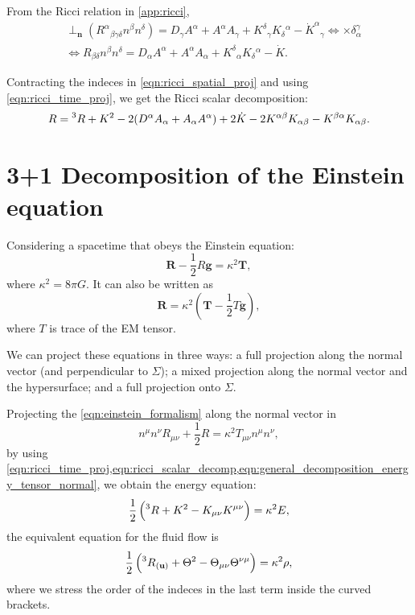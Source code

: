 From the Ricci relation in \cref{app:ricci},
\begin{align}
    &\perp_{\mathbf{n}} (R^\alpha{}_{\beta\gamma\delta} n^\beta n^\delta) = D_\gamma A^\alpha + A^\alpha A_\gamma + K^\delta{}_\gamma K_\delta{}^\alpha - \dot{K}^\alpha{}_\gamma \Leftrightarrow \times \delta^\gamma_\alpha\\
    &\Leftrightarrow  R_{\beta\delta}n^\beta n^\delta = D_\alpha A^\alpha + A^\alpha A_\alpha + K^\delta{}_\alpha K_\delta{}^\alpha -\dot{K}.
    \label{eqn:ricci_time_proj}
\end{align}


Contracting the indeces in \cref{eqn:ricci_spatial_proj} and using \cref{eqn:ricci_time_proj}, we get the Ricci scalar decomposition:
\begin{align}
    R = \prescript{3}{}R+K^2 - 2(D^\alpha A_\alpha +  A_\alpha A^\alpha) + 2\dot{K}-2K^{\alpha\beta}K_{\alpha\beta}-K^{\beta\alpha}K_{\alpha\beta}.
    \label{eqn:ricci_scalar_decomp}
\end{align}



\section{3+1 Decomposition of the Einstein equation}

Considering a spacetime that obeys the Einstein equation:
\begin{equation}
    \mathbf{R}-\frac{1}{2}R\mathbf{g}=\kappa^2 \mathbf{T},
    \label{eqn:einstein_formalism}
\end{equation}
where $\kappa^2=8\pi G$. It can also be written as
\begin{equation}
    \mathbf{R}=\kappa^2 \left(\mathbf{T}-\frac{1}{2}T\mathbf{g}\right),
    \label{eqn:einstein_equiv}
\end{equation}
where $T$ is trace of the EM tensor.

We can project these equations in three ways: a full projection along the normal vector (and perpendicular to $\Sigma$); a mixed projection along the normal vector and the hypersurface; and a full projection onto $\Sigma$.

Projecting the \cref{eqn:einstein_formalism} along the normal vector in
\begin{equation}
    n^\mu n^\nu R_{\mu\nu}+\frac{1}{2}R=\kappa^2 T_{\mu\nu}n^\mu n^\nu,
\end{equation}
by using \cref{eqn:ricci_time_proj,eqn:ricci_scalar_decomp,eqn:general_decomposition_energy_tensor_normal}, we obtain the energy equation:
\begin{equation}
    \frac{1}{2}\left(\prescript{3}{}R+K^2-K_{\mu\nu}K^{\mu\nu}\right)=\kappa^2 E,
\end{equation}
the equivalent equation for the fluid flow is
\begin{equation}
    \frac{1}{2}\left(\prescript{3}{}R_{(\mathbf{u})}+\Theta^2-\Theta_{\mu\nu}\Theta^{\nu\mu}\right)=\kappa^2\rho,
\end{equation}
where we stress the order of the indeces in the last term inside the curved brackets.




